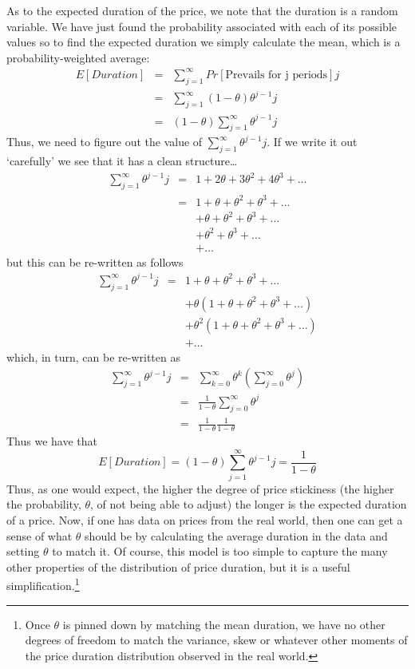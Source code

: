 \documentclass[authoryear,11pt]{elsarticle}
\begin{document}
As to the expected duration of the price, we note that the duration is a random variable. We have just found the probability associated with each of its possible values so to find the expected duration we simply calculate the mean, which is a probability-weighted average:
\begin{eqnarray*}
E[Duration] 	&=& \sum\limits_{j=1}^{\infty} Pr[\text{Prevails for j periods}] j \\
			&=& \sum\limits_{j=1}^{\infty} (1-\theta) \theta^{j-1} j	\\
			&=& (1-\theta)  \sum\limits_{j=1}^{\infty} \theta^{j-1} j
\end{eqnarray*}
Thus, we need to figure out the value of $\sum\limits_{j=1}^{\infty} \theta^{j-1} j$. If we write it out `carefully' we see that it has a clean structure\ldots
\begin{eqnarray*}
\sum\limits_{j=1}^{\infty} \theta^{j-1} j	&=& 1 + 2\theta + 3 \theta^2 + 4\theta^3 +\ldots	\\
										&=& 1 + \theta + \theta^2 + \theta^3 + \ldots	\\
										& &  + \theta + \theta^2 + \theta^3 + \ldots	\\
										&&   + \theta^2 + \theta^3 + \ldots	\\
										&&	 + \ldots
\end{eqnarray*}
but this can be re-written as follows
\begin{eqnarray*}
\sum\limits_{j=1}^{\infty} \theta^{j-1} j	&=& 1 + \theta + \theta^2 + \theta^3 + \ldots	\\
										& &  + \theta(1 + \theta + \theta^2 + \theta^3 + \ldots) \\
										& &  + \theta^2(1 + \theta + \theta^2 + \theta^3 + \ldots) \\	
										&&   + \ldots
\end{eqnarray*}
which, in turn, can be re-written as
\begin{eqnarray*}
\sum\limits_{j=1}^{\infty} \theta^{j-1} j	&=& \sum\limits_{k=0}^{\infty}\theta^{k} \left(  \sum\limits_{j=0}^{\infty}\theta^{j} \right)	\\
										&=& \frac{1}{1-\theta} \sum\limits_{j=0}^{\infty}\theta^{j}				\\
										&=& \frac{1}{1-\theta} \frac{1}{1-\theta}
\end{eqnarray*}
Thus we have that 
\[
E[Duration]  = (1-\theta) \sum\limits_{j=1}^{\infty} \theta^{j-1} j =  \frac{1}{1-\theta}
\]
Thus, as one would expect, the higher the degree of price stickiness (the higher the probability, $\theta$, of not being able to adjust) the longer is the expected duration of a price. Now, if one has data on prices from the real world, then one can get a sense of what $\theta$ should be by calculating the average duration in the data and setting $\theta$ to match it. Of course, this model is too simple to capture the many other properties of the distribution of price duration, but it is a useful simplification.\footnote{Once $\theta$ is pinned down by matching the mean duration, we have no other degrees of freedom to match the variance, skew or whatever other moments of the price duration distribution observed in the real world.}
\end{document}

